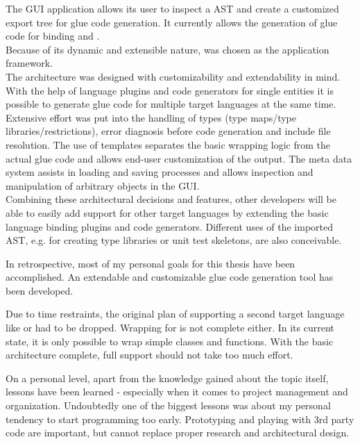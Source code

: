 The  GUI application allows its user to inspect a  AST and create a customized export tree for glue code generation. It currently allows the generation of glue code for binding  and .\\
Because of its dynamic and extensible nature,  was chosen as the application framework.\\
The architecture was designed with customizability and extendability in mind. With the help of language plugins and code generators for single  entities it is possible to generate glue code for multiple target languages at the same time. Extensive effort was put into the handling of types (type maps/type libraries/restrictions), error diagnosis before code generation and include file resolution. The use of templates separates the basic wrapping logic from the actual glue code and allows end-user customization of the output. The meta data system assists in loading and saving processes and allows inspection and manipulation of arbitrary  objects in the GUI.\\
Combining these architectural decisions and features, other developers will be able to easily add support for other target languages by extending the basic language binding plugins and code generators. Different uses of the imported  AST, e.g. for creating type libraries or unit test skeletons, are also conceivable.

In retrospective, most of my personal goals for this thesis have been accomplished. An extendable and customizable glue code generation tool has been developed.

Due to time restraints, the original plan of supporting a second target language like  or  had to be dropped. Wrapping for  is not complete either. In its current state, it is only possible to wrap simple classes and functions. With the basic architecture complete, full support should not take too much effort.

On a personal level, apart from the knowledge gained about the topic itself, lessons have been learned - especially when it comes to project management and organization. Undoubtedly one of the biggest lessons was about my personal tendency to start programming too early. Prototyping and playing with 3rd party code are important, but cannot replace proper research and architectural design.

